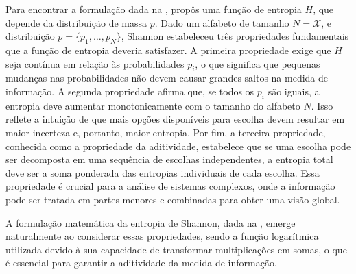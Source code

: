Para encontrar a formulação dada na ,
\textcite{shannon1948} propôs uma função de entropia $H$, que depende da
distribuição de massa $p$. Dado um alfabeto de tamanho $N = \mathcal{X}$, e
distribuição $p = \{p_1,\ldots,p_N\}$, Shannon estabeleceu três propriedades
fundamentais que a função de entropia deveria satisfazer. A primeira
propriedade exige que $H$ seja contínua em relação às probabilidades $p_i$, o
que significa que pequenas mudanças nas probabilidades não devem causar grandes
saltos na medida de informação. A segunda propriedade afirma que, se todos os
$p_i$ são iguais, a entropia deve aumentar monotonicamente com o tamanho do
alfabeto $N$. Isso reflete a intuição de que mais opções disponíveis para
escolha devem resultar em maior incerteza e, portanto, maior entropia. Por fim,
a terceira propriedade, conhecida como a propriedade da aditividade, estabelece
que se uma escolha pode ser decomposta em uma sequência de escolhas
independentes, a entropia total deve ser a soma ponderada das entropias
individuais de cada escolha. Essa propriedade é crucial para a análise de
sistemas complexos, onde a informação pode ser tratada em partes menores e
combinadas para obter uma visão global.

A formulação matemática da entropia de Shannon, dada na ,
emerge naturalmente ao considerar essas propriedades, sendo a função
logarítmica utilizada devido à sua capacidade de transformar multiplicações em
somas, o que é essencial para garantir a aditividade da medida de informação.

